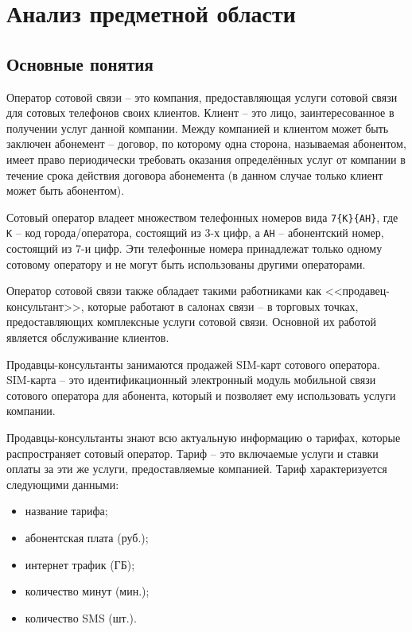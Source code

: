 \section{Анализ предметной области}\label{sec:domain-analysis}


\subsection{Основные понятия}


Оператор сотовой связи -- это компания, предоставляющая услуги сотовой связи для сотовых телефонов своих клиентов. Клиент -- это лицо, заинтересованное в получении услуг данной компании. Между компанией и клиентом может быть заключен абонемент -- договор, по которому одна сторона, называемая абонентом, имеет право периодически требовать оказания определённых услуг от компании в течение срока действия договора абонемента (в данном случае только клиент может быть абонентом).

Сотовый оператор владеет множеством телефонных номеров вида \texttt{7\{К\}\{АН\}}, где \texttt{К} -- код города/оператора, состоящий из 3-х цифр, а \texttt{АН} -- абонентский номер, состоящий из 7-и цифр. Эти телефонные номера принадлежат только одному сотовому оператору и не могут быть использованы другими операторами.

Оператор сотовой связи также обладает такими работниками как <<продавец-консультант>>, которые работают в салонах связи -- в торговых точках, предоставляющих комплексные услуги сотовой связи. Основной их работой является обслуживание клиентов.

Продавцы-консультанты занимаются продажей SIM-карт сотового оператора. SIM-карта -- это идентификационный электронный модуль мобильной связи сотового оператора для абонента, который и позволяет ему использовать услуги компании.

Продавцы-консультанты знают всю актуальную информацию о тарифах, которые распространяет сотовый оператор. Тариф -- это включаемые услуги и ставки оплаты за эти же услуги, предоставляемые компанией. Тариф характеризуется следующими данными:
\begin{itemize}
    \item название тарифа;
    \item абонентская плата (руб.);
    \item интернет трафик (ГБ);
    \item количество минут (мин.);
    \item количество SMS (шт.).
\end{itemize}

